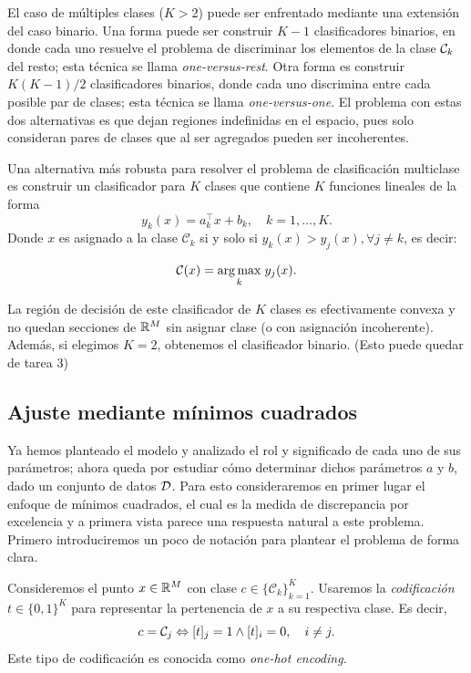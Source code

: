 El caso de múltiples clases ($K>2$) puede ser enfrentado mediante una extensión del caso binario. Una forma puede ser construir $K-1$ clasificadores binarios, en donde cada uno  resuelve el problema de discriminar los elementos de la  clase ${\mathcal C}_k$ del resto; esta técnica se llama \emph{one-versus-rest}. Otra forma es construir $K(K-1)/2$ clasificadores binarios, donde cada uno discrimina entre cada posible par de clases; esta técnica se llama \emph{one-versus-one}. El problema con estas dos alternativas es que dejan  regiones indefinidas en el espacio, pues solo consideran pares de clases que  al ser agregados pueden ser incoherentes. 

Una alternativa más robusta para resolver el problema de clasificación multiclase es construir un clasificador para $K$ clases que contiene $K$ funciones lineales de la forma
\begin{equation}
	y_k(x) = a_k^\top x + b_k, \quad k=1,\ldots,K.
\end{equation}
Donde $x$ es asignado a la clase $\mathcal{C}_k$ si y solo si $y_k(x) > y_j(x), \forall j\neq k$, es decir:

\begin{equation}
	\mathcal{C}(x) = \underset{k}{\operatorname*{arg\,max}}\hspace{1mm} y_j(x).
\end{equation}

La región de decisión de este clasificador de $K$ clases es efectivamente convexa y no  quedan secciones de ${\mathbb R}^M$ sin asignar clase (o con asignación incoherente). Además, si elegimos $K=2$, obtenemos el clasificador  binario. (Esto puede quedar de tarea 3)

\subsection{Ajuste mediante mínimos cuadrados}

Ya hemos planteado el modelo y analizado el rol  y significado de cada uno de sus parámetros; ahora queda por estudiar cómo determinar dichos parámetros $a$ y $b$, dado un conjunto de datos ${\mathcal D}$. Para esto consideraremos en primer lugar el enfoque de mínimos cuadrados, el cual es la medida de discrepancia  por  excelencia  y a primera vista  parece una respuesta natural a este problema. Primero  introduciremos un poco de notación para plantear el problema de forma clara.

Consideremos el  punto $x\in{\mathbb R}^M$ con clase $c\in\{\mathcal{C}_k\}_{k=1}^K$. Usaremos la \emph{codificación} $t \in\{0,1\}^K$ para representar la pertenencia de $x$ a su respectiva clase. Es decir, 
\begin{equation}
	c = {\mathcal C}_j \Leftrightarrow [t]_j=1 \wedge [t]_i=0, \quad i\neq j.
\end{equation}
Este tipo de codificación  es conocida como \emph{one-hot  encoding.}  

